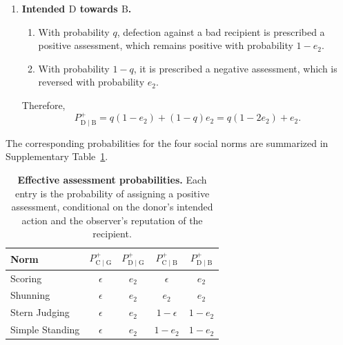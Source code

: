 \documentclass[fleqn,10pt]{wlscirep}
\begin{document}
\begin{enumerate}
\begin{enumerate}
\item With probability $e_1$, cooperation fails and is implemented as defection. With probability $1-q$, it is prescribed a negative assessment, which is reversed with probability $e_2$.
\end{enumerate}

Summing these four mutually exclusive events gives
\begin{equation}
    \begin{aligned}
    P^+_{\mathrm{C}\mid\mathrm{B}}
    ={}&(1-e_1)
    \left[p(1-e_2)+(1-p)e_2\right]+e_1
    \left[q(1-e_2)+(1-q)e_2\right] \\
    ={}&p(\epsilon-e_2)
    +q(1-\epsilon-e_2)+e_2.
    \end{aligned}
\end{equation}

\item \textbf{Intended $\mathrm{D}$ towards $\mathrm{B}$.}

\begin{enumerate}
\item With probability $q$, defection against a bad recipient is prescribed a positive assessment, which remains positive with probability $1-e_2$.

\item With probability $1-q$, it is prescribed a negative assessment, which is reversed with probability $e_2$.
\end{enumerate}

Therefore,
\begin{equation}
    P^+_{\mathrm{D}\mid\mathrm{B}}=q(1-e_2)+(1-q)e_2=q(1-2e_2)+e_2.
\end{equation}
\end{enumerate}

The corresponding probabilities for the four social norms are summarized in Supplementary Table~\ref{tab:si-effective-assessment}.

\begin{table}[H]
\centering
\caption{\textbf{Effective assessment probabilities.} Each entry is the probability of assigning a positive assessment, conditional on the donor's intended action and the observer's reputation of the recipient.}
\label{tab:si-effective-assessment}
\begin{tabular}{lcccc}
\toprule
Norm
& $P^+_{\mathrm{C}\mid\mathrm{G}}$
& $P^+_{\mathrm{D}\mid\mathrm{G}}$
& $P^+_{\mathrm{C}\mid\mathrm{B}}$
& $P^+_{\mathrm{D}\mid\mathrm{B}}$\\
\midrule
Scoring & $\epsilon$ & $e_2$ & $\epsilon$ & $e_2$\\
Shunning & $\epsilon$ & $e_2$ & $e_2$ & $e_2$\\
Stern Judging & $\epsilon$ & $e_2$ & $1-\epsilon$ & $1-e_2$\\
Simple Standing & $\epsilon$ & $e_2$ & $1-e_2$ & $1-e_2$\\
\bottomrule
\end{tabular}
\end{table}
\end{document}
